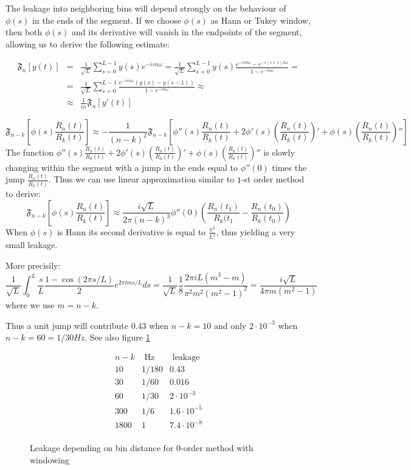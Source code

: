 \documentclass[12pt]{article}
\def\FTC#1#2{{\mathfrak F}_{#1}\left[#2\right]}
\def\FFTNORM{\frac{1}{\sqrt{ L}}}
\begin{document}
The leakage into neighboring bins will depend strongly on the behaviour of $\phi(s)$ in
the ends of the segment. If we choose $\phi(s)$ as Hann or Tukey window, then
both  $\phi(s)$ and its derivative will vanish in the endpoints of the segment,
allowing us to derive the following estimate:

$$
\begin{array}{rcl}
\FTC{n}{y(t)}&=&\FFTNORM \sum_{s=0}^{L-1}y(s)e^{-isn\omega}=\FFTNORM \sum_{s=0}^{L-1}y(s)\frac{e^{-isn\omega}-e^{-i(s+1)n\omega}}{1-e^{-in\omega}}=\\
&=&\FFTNORM \sum_{s=0}^{L-1}\frac{e^{-isn\omega}(y(s)-y(s-1))}{1-e^{-in\omega}}\approx\\
&\approx&\frac{1}{in}\FTC{n}{y'(t)}
\end{array}
$$
\fi

$$
\FTC{n-k}{\phi(s)\frac{R_n(t)}{R_k(t)}}\approx -\frac{1}{(n-k)^2}\FTC{n-k}{\phi''(s)\frac{R_n(t)}{R_k(t)}+2\phi'(s)\left(\frac{R_n(t)}{R_k(t)}\right)'+\phi(s)\left(\frac{R_n(t)}{R_k(t)}\right)''}
$$
The function $\phi''(s)\frac{R_n(t)}{R_k(t)}+2\phi'(s)\left(\frac{R_n(t)}{R_k(t)}\right)'+\phi(s)\left(\frac{R_n(t)}{R_k(t)}\right)''$
is slowly changing within the segment with a jump in the ends equal to $\phi''(0)$ times the jump $\frac{R_n(t)}{R_k(t)}$.
Thus we can use linear approximation similar to $1$-st order method to derive:
$$
\FTC{n-k}{\phi(s)\frac{R_n(t)}{R_k(t)}}\approx \frac{i\sqrt{L}}{2\pi (n-k)^3}\phi''(0)\left(\frac{R_n(t_1)}{R_k(t_1}-\frac{R_n(t_0)}{R_k(t_0)}\right)
$$
When $\phi(s)$ is Hann its second derivative is equal to $\frac{\pi^2}{L^2}$, thus yielding a very
small leakage.
\fi

More precisily:
$$
\FFTNORM\int_0^L \frac{s}{L}\frac{1-\cos(2\pi s/L)}{2}e^{2\pi i ms/L}ds=\FFTNORM\frac{1}{8}\frac{2\pi i L (m^3-m)}{\pi^2m^2(m^2-1)^2}=\frac{i \sqrt{L}}{4 \pi m (m^2-1)}
$$
where we use $m=n-k$.

Thus a unit jump will contribute $0.43$ when $n-k=10$ and only $2\cdot 10^{-3}$ when
 $n-k=60=1/30 Hz$. See also figure \ref{leakage_0_w}

\begin{figure}
\label{leakage_0_w}
$$
\begin{array}{c|c|c}
n-k & \textrm{ Hz } & \textrm{ leakage } \\
\hline
10  &  1/180 & 0.43 \\
30  &  1/60  & 0.016 \\
60  &  1/30  & 2\cdot 10^{-3} \\
300 &  1/6   & 1.6 \cdot 10^{-5} \\
1800 & 1   & 7.4 \cdot 10^{-8} \\
\end{array}
$$
\caption{Leakage depending on bin distance for $0$-order method with windowing}
\end{figure}
\end{document}

